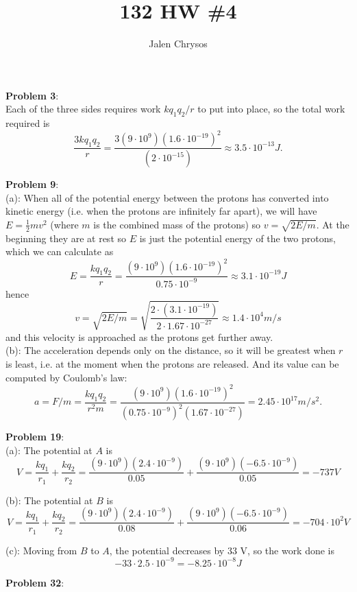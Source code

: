 \documentclass{amsart}
\title{132 HW \#4}
\author{Jalen Chrysos}
\begin{document}
	
	\maketitle

	\textbf{Problem 3}: \\
	Each of the three sides requires work $kq_1q_2/r$ to put into place, so the total work required is 
	$$
	\frac{3kq_1q_2}{r} = \frac{3(9\cdot 10^9)(1.6\cdot 10^{-19})^2}{(2\cdot 10^{-15})} \approx 3.5\cdot 10^{-13} J.
	$$
	
	\textbf{Problem 9}:\\
	
	(a): When all of the potential energy between the protons has converted into kinetic energy (i.e. when the protons are infinitely far apart), we will have $E=\tfrac12mv^2$ (where $m$ is the combined mass of the protons) so $v=\sqrt{2E/m}$. At the beginning they are at rest so $E$ is just the potential energy of the two protons, which we can calculate as 
	$$
	E = \frac{kq_1q_2}{r} = \frac{(9\cdot 10^9)(1.6\cdot 10^{-19})^2}{0.75 \cdot 10^{-9}} \approx 3.1 \cdot 10^{-19} J
	$$
	hence 
	$$
	v = \sqrt{2E/m} = \sqrt{\frac{2 \cdot (3.1\cdot 10^{-19})}{2\cdot 1.67 \cdot 10^{-27}}} \approx 1.4 \cdot 10^4 m/s
	$$
	and this velocity is approached as the protons get further away.\\
	
	(b): The acceleration depends only on the distance, so it will be greatest when $r$ is least, i.e. at the moment when the protons are released. And its value can be computed by Coulomb's law:
	$$
	a = F/m = \frac{kq_1q_2}{r^2m} = \frac{(9\cdot 10^9)(1.6\cdot 10^{-19})^2}{(0.75\cdot 10^{-9})^2(1.67 \cdot 10^{-27})} = 2.45 \cdot 10^{17} m/s^2.
	$$
	
	\textbf{Problem 19}:\\
	
	(a): The potential at $A$ is 
	$$
	V = \frac{kq_1}{r_1} + \frac{kq_2}{r_2} = \frac{(9\cdot 10^9)(2.4\cdot 10^{-9})}{0.05} + \frac{(9\cdot 10^9)(-6.5\cdot 10^{-9})}{0.05} = -737 V
	$$
	
	(b): The potential at $B$ is
	$$
	V = \frac{kq_1}{r_1} + \frac{kq_2}{r_2} = \frac{(9\cdot 10^9)(2.4\cdot 10^{-9})}{0.08} + \frac{(9\cdot 10^9)(-6.5\cdot 10^{-9})}{0.06} = -704 \cdot 10^2 V
	$$
	
	(c): Moving from $B$ to $A$, the potential decreases by 33 V, so the work done is 
	$$
	-33\cdot 2.5 \cdot 10^{-9} = -8.25 \cdot 10^{-8} J
	$$
	
	\textbf{Problem 32}:\\
	
\end{document}
